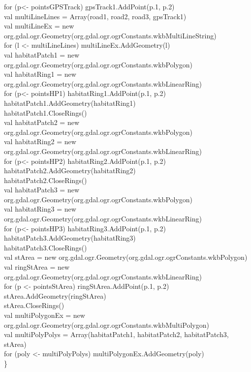 \documentclass {article}
\begin{document}
\begin{appendices}
for (p<- pointsGPSTrack) gpsTrack1.AddPoint(p.\underline{\space}1, p.\underline{\space}2)\\
val multiLineLines = Array(road1, road2, road3, gpsTrack1)\\
val multiLineEx = new org.gdal.ogr.Geometry(org.gdal.ogr.ogrConstants.wkbMultiLineString)\\
for (l <- multiLineLines) multiLineEx.AddGeometry(l)\\
val habitatPatch1 = new org.gdal.ogr.Geometry(org.gdal.ogr.ogrConstants.wkbPolygon)\\
val habitatRing1 = new org.gdal.ogr.Geometry(org.gdal.ogr.ogrConstants.wkbLinearRing)\\
for (p<- pointsHP1) habitatRing1.AddPoint(p.\underline{\space}1, p.\underline{\space}2)\\
habitatPatch1.AddGeometry(habitatRing1)\\
habitatPatch1.CloseRings()\\
val habitatPatch2 = new org.gdal.ogr.Geometry(org.gdal.ogr.ogrConstants.wkbPolygon)\\
val habitatRing2 = new org.gdal.ogr.Geometry(org.gdal.ogr.ogrConstants.wkbLinearRing)\\
for (p<- pointsHP2) habitatRing2.AddPoint(p.\underline{\space}1, p.\underline{\space}2)\\
habitatPatch2.AddGeometry(habitatRing2)\\
habitatPatch2.CloseRings()\\
val habitatPatch3 = new org.gdal.ogr.Geometry(org.gdal.ogr.ogrConstants.wkbPolygon)\\
val habitatRing3 = new org.gdal.ogr.Geometry(org.gdal.ogr.ogrConstants.wkbLinearRing)\\
for (p<- pointsHP3) habitatRing3.AddPoint(p.\underline{\space}1, p.\underline{\space}2)\\
habitatPatch3.AddGeometry(habitatRing3)\\
habitatPatch3.CloseRings()\\
val stArea = new org.gdal.ogr.Geometry(org.gdal.ogr.ogrConstants.wkbPolygon)\\
val ringStArea = new org.gdal.ogr.Geometry(org.gdal.ogr.ogrConstants.wkbLinearRing)\\
for (p <- pointsStArea) ringStArea.AddPoint(p.\underline{\space}1, p.\underline{\space}2)\\
stArea.AddGeometry(ringStArea)\\
stArea.CloseRings()\\
val multiPolygonEx = new org.gdal.ogr.Geometry(org.gdal.ogr.ogrConstants.wkbMultiPolygon)\\
val multiPolyPolys = Array(habitatPatch1, habitatPatch2, habitatPatch3, stArea)\\
for (poly <- multiPolyPolys) multiPolygonEx.AddGeometry(poly)\\
\}
\\
\\

\end{appendices}
\end{document}
